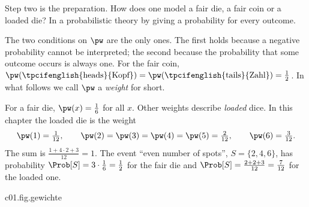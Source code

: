 Step two is the preparation. How does one model a fair die, a fair coin or a loaded die?
In a probabilistic theory by giving a probability for every outcome.


The two conditions on $\pw$ are the only ones. The first holds because a negative
probability cannot be interpreted; the second because the probability that some outcome
occurs is always one. For the fair coin,
$\pw(\text{\tpcifenglish{heads}{Kopf}}) = \pw(\text{\tpcifenglish{tails}{Zahl}}) = \tfrac12$.
In what follows we call $\pw$ a \emph{weight} for short.

\begin{example}\label{c01.ex.gezinkt}
  For a fair die, $\pw(x) = \tfrac16$ for all $x$. Other weights describe \emph{loaded}
  dice. In this chapter the loaded die is the weight
  \begin{equation}\label{c01.eq.gezinkt}
    \pw(1) = \tfrac{1}{12}, \qquad
    \pw(2) = \pw(3) = \pw(4) = \pw(5) = \tfrac{2}{12}, \qquad
    \pw(6) = \tfrac{3}{12} .
  \end{equation}
  The sum is $\tfrac{1 + 4\cdot 2 + 3}{12} = 1$. The event “even number of spots”,
  $S = \{2,4,6\}$, has probability
  $\Prob[S] = 3\cdot\tfrac16 = \tfrac12$ for the fair die and
  $\Prob[S] = \tfrac{2 + 2 + 3}{12} = \tfrac{7}{12}$ for the loaded one.
\end{example}

\begin{tpcfigure}{c01.fig.gewichte}
  \caption{Three weights on the outcome set $\{1, \dots, 6\}$ of a die. The height of a bar
    is $\pw(x)$; in each picture the sum of all heights is $1$. (a) Fair die. (b) The
    loaded die of equation~\eqref{c01.eq.gezinkt}. (c) A point weight: the whole weight
    lies on the outcome $3$. Such weights describe deterministic preparations
    (Proposition~\ref{c01.prop.punktgewicht}).}
\end{tpcfigure}

